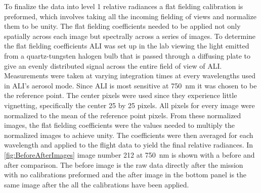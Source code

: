 \documentclass[12pt]{article}
\begin{document}
To finalize the data into level 1 relative radiances a flat fielding calibration is preformed, which involves taking all the incoming fielding of views and normalize them to be unity. The flat fielding coefficients needed to be applied not only spatially across each image but spectrally across a series of images. To determine the flat fielding coefficients ALI was set up in the lab viewing the light emitted from a quartz-tungsten halogen bulb that is passed through a diffusing plate to give an evenly distributed signal across the entire field of view of ALI. Measurements were taken at varying integration times at every wavelengths used in ALI's aerosol mode. Since ALI is most sensitive at 750~nm it was chosen to be the reference point. The center pixels were used since they experience little vignetting, specifically the center 25 by 25 pixels. All pixels for every image were normalized to the mean of the reference point pixels. From these normalized images, the flat fielding coefficients were the values needed to multiply the normalized images to achieve unity. The coefficients were then averaged for each wavelength and applied to the flight data to yield the final relative radiances. In \autoref{fig:BeforeAfterImages} image number 212 at 750~nm is shown with a before and after comparison. The before image is the raw data directly after the mission with no calibrations preformed and the after image in the bottom panel is the same image after the all the calibrations have been applied.

\end{document}
